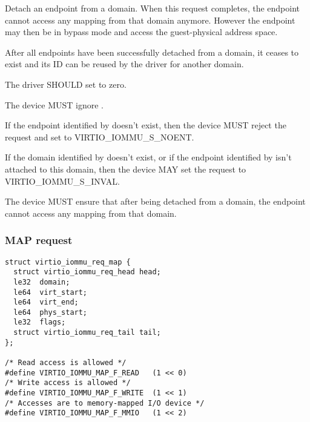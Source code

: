 Detach an endpoint from a domain. When this request completes,
the endpoint cannot access any mapping from that domain anymore.
However the endpoint may then be in bypass mode and access the
guest-physical address space.

After all endpoints have been successfully detached from a domain, it
ceases to exist and its ID can be reused by the driver for another domain.


The driver SHOULD set  to zero.


The device MUST ignore .

If the endpoint identified by  doesn't exist, then the
device MUST reject the request and set  to
VIRTIO_IOMMU_S_NOENT.

If the domain identified by  doesn't exist, or if the
endpoint identified by  isn't attached to this domain,
then the device MAY set the request  to
VIRTIO_IOMMU_S_INVAL.

The device MUST ensure that after being detached from a domain, the
endpoint cannot access any mapping from that domain.

\subsubsection{MAP request}\label{sec:Device Types / IOMMU Device / Device operations / MAP request}

\begin{lstlisting}
struct virtio_iommu_req_map {
  struct virtio_iommu_req_head head;
  le32  domain;
  le64  virt_start;
  le64  virt_end;
  le64  phys_start;
  le32  flags;
  struct virtio_iommu_req_tail tail;
};

/* Read access is allowed */
#define VIRTIO_IOMMU_MAP_F_READ   (1 << 0)
/* Write access is allowed */
#define VIRTIO_IOMMU_MAP_F_WRITE  (1 << 1)
/* Accesses are to memory-mapped I/O device */
#define VIRTIO_IOMMU_MAP_F_MMIO   (1 << 2)
\end{lstlisting}

